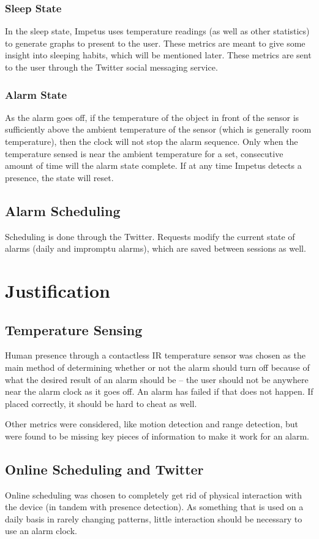 \subsubsection{Sleep State}
In the sleep state, Impetus uses temperature readings (as well as
other statistics) to generate graphs to present to the user. These
metrics are meant to give some insight into sleeping habits, which
will be mentioned later. These metrics are sent to the user through
the Twitter social messaging service.

\subsubsection{Alarm State}
As the alarm goes off, if the temperature of the object in front of
the sensor is sufficiently above the ambient temperature of the sensor
(which is generally room temperature), then the clock will not stop
the alarm sequence. Only when the temperature sensed is near the
ambient temperature for a set, consecutive amount of time will the
alarm state complete. If at any time Impetus detects a presence, the
state will reset.

\subsection{Alarm Scheduling}
Scheduling is done through the Twitter. Requests modify the current
state of alarms (daily and impromptu alarms), which are saved between
sessions as well.

\section{Justification}
\subsection{Temperature Sensing}
Human presence through a contactless IR temperature sensor was chosen
as the main method of determining whether or not the alarm should turn
off because of what the desired result of an alarm should be -- the
user should not be anywhere near the alarm clock as it goes off. An
alarm has failed if that does not happen. If placed correctly, it
should be hard to cheat as well.

Other metrics were considered, like motion detection and range
detection, but were found to be missing key pieces of information to
make it work for an alarm.

\subsection{Online Scheduling and Twitter}
Online scheduling was chosen to completely get rid of physical
interaction with the device (in tandem with presence detection). As
something that is used on a daily basis in rarely changing patterns,
little interaction should be necessary to use an alarm clock.

